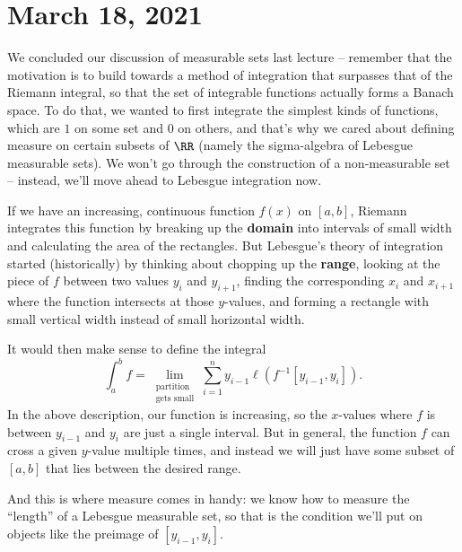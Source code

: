 
\pagebreak\section*{March 18, 2021}

We concluded our discussion of measurable sets last lecture -- remember that the motivation is to build towards a method of integration that surpasses that of the Riemann integral, so that the set of integrable functions actually forms a Banach space. To do that, we wanted to first integrate the simplest kinds of functions, which are $1$ on some set and $0$ on others, and that's why we cared about defining measure on certain subsets of $\RR$ (namely the sigma-algebra of Lebesgue measurable sets). We won't go through the construction of a non-measurable set -- instead, we'll move ahead to Lebesgue integration now. 

\begin{fact}[Informal]
If we have an increasing, continuous function $f(x)$ on $[a, b]$, Riemann integrates this function by breaking up the \textbf{domain} into intervals of small width and calculating the area of the rectangles. But Lebesgue's theory of integration started (historically) by thinking about chopping up the \textbf{range}, looking at the piece of $f$ between two values $y_i$ and $y_{i+1}$, finding the corresponding $x_i$ and $x_{i+1}$ where the function intersects at those $y$-values, and forming a rectangle with small vertical width instead of small horizontal width. 
\end{fact}

It would then make sense to define the integral
\[
    \int_a^b f = \lim_{\substack{\text{partition} \\ \text{gets small}}} \sum_{i=1}^n y_{i-1} \ell(f^{-1}[y_{i-1}, y_i]).
\]
In the above description, our function is increasing, so the $x$-values where $f$ is between $y_{i-1}$ and $y_i$ are just a single interval. But in general, the function $f$ can cross a given $y$-value multiple times, and instead we will just have some subset of $[a, b]$ that lies between the desired range. 

And this is where measure comes in handy: we know how to measure the ``length'' of a Lebesgue measurable set, so that is the condition we'll put on objects like the preimage of $[y_{i-1}, y_i]$. 


